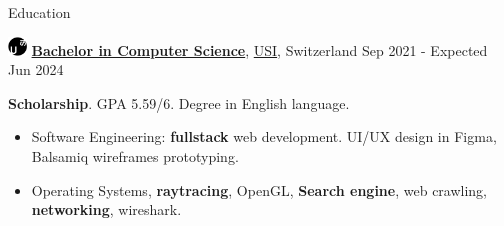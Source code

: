 \documentclass{cv} %
\def\titlelistvspace{-0.15cm}
\begin{document}
\begin{rSection}{Education}

    \includegraphics[width=0.5cm, trim={0cm 5cm 0cm 0cm}]{usi-icon.png}
    {\bf \underline{Bachelor in Computer Science}},
    \href{https://www.usi.ch/en}{USI}, Switzerland
    \hfill {Sep 2021 - Expected Jun 2024}

    \textbf{Scholarship}. GPA 5.59/6. Degree in English language.

    \vspace{\titlelistvspace}\begin{itemize}
        \itemsep -3pt {}
        \item Software Engineering: \textbf{fullstack} web development.
              UI/UX design in Figma, Balsamiq wireframes prototyping.
        \item Operating Systems,
              \textbf{raytracing},
              OpenGL,
              \textbf{Search engine},
              web crawling,
              \textbf{networking},
              wireshark.

\end{itemize}
\end{rSection}
\end{document}
